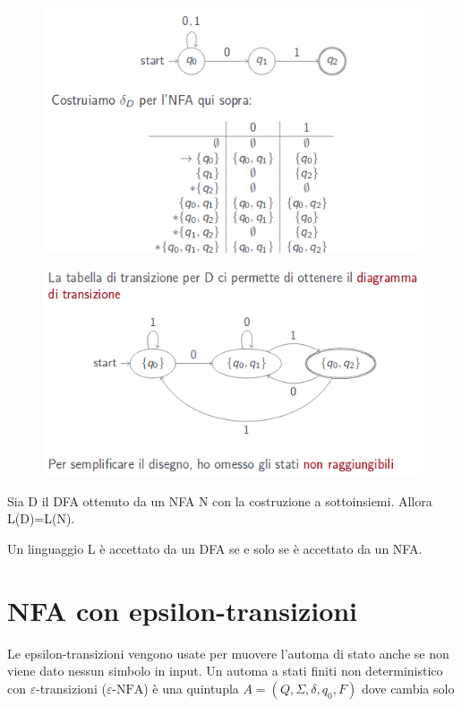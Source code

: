 \begin{figure}[h]
\centering 
\includegraphics[scale=0.5]{Immagini/equivalenza1.png}
\end{figure}

\begin{figure}[h]
\centering 
\includegraphics[scale=0.5]{Immagini/equivalenza2.png}
\end{figure}

\begin{thm}
Sia D il DFA ottenuto da un NFA N con la costruzione a sottoinsiemi. Allora
L(D)=L(N).
\end{thm}

\begin{thm}
Un linguaggio L è accettato da un DFA se e solo se è accettato da un NFA.
\end{thm}

\section{NFA con epsilon-transizioni}
Le epsilon-transizioni vengono usate per muovere l'automa di stato anche se non
viene dato nessun simbolo in input.
Un automa a stati finiti non deterministico con $\varepsilon$\textrm{-transizioni} ($
\varepsilon\textrm{-NFA}$)
è una quintupla $A=(Q, \Sigma, \delta, q_0, F)$ dove cambia solo

